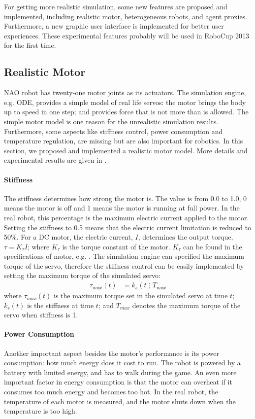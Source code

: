 \documentclass{llncs}
\begin{document}
For getting more realistic simulation, some new features are proposed and implemented, including realistic motor, heterogeneous robots, and agent proxies. Furthermore, a new graphic user interface is implemented for better user experiences.
These experimental features probably will be used in RoboCup 2013 for the first time.

\subsection{Realistic Motor}
NAO robot has twenty-one motor joints as its actuators.
The simulation engine, e.g. ODE, provides a simple model of real life servos:
the motor brings the body up to speed in one step; and provides force that is not more than is allowed.
The simple motor model is one reason for the unrealistic simulation results.
Furthermore, some aspects like stiffness control, power consumption and temperature regulation, are missing but are also important for robotics.
In this section, we proposed and implemented a realistic motor model. More details and experimental results are given in \cite{Xu2012}.

\paragraph{Stiffness}
The stiffness determines how strong the motor is. The value is from 0.0
to 1.0, 0 means the motor is off and 1 means the motor is running at
full power. In the real robot,
this percentage is the maximum electric current applied to the motor. Setting the
stiffness to 0.5 means that the electric current limitation is reduced
to 50\%.
For a DC motor, the electric current, $I$, determines the output torque,
$\tau = K_\tau I \label{eq:tau-i}$;
where $K_\tau$ is the torque constant of the motor. $K_\tau$ can be found in the
specifications of motor, e.g. \cite{naoqi}.
The simulation engine can specified the maximum torque of the servo, therefore the
stiffness control can be easily implemented by setting the maximum torque
of the simulated servo:
\begin{align}
  \tau_{max}(t) &= k_{s}(t) T_{max}
\end{align}
where $\tau_{max}(t)$ is the maximum torque set in the simulated servo at
time $t$; $k_{s}(t)$ is the stiffness at time $t$; and $T_{max}$
denotes the maximum torque of the servo when stiffness is 1.

\paragraph{Power Consumption}
Another important aspect besides the motor's performance is its
power consumption: how much energy does it cost to run.
The robot is powered by a battery with limited energy, and has to walk during the
game.
An even more important factor in energy consumption is
that the motor can overheat if it consumes too much energy and
becomes too hot.
In the real robot, the temperature of each motor is measured, and the motor shuts down 
when the temperature is too high.
\end{document}
